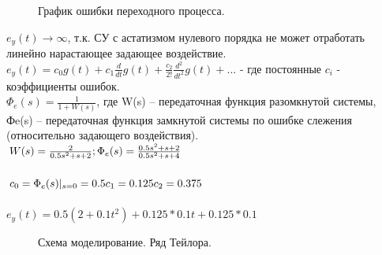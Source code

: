 \documentclass[a4paper, 11pt]{article}
\begin{document}
\begin{figure}[h!]
    \caption{График ошибки переходного процесса.}
    \label{tree}
\end{figure}

\newpage

$e_y(t)\to\infty$, т.к. СУ с астатизмом нулевого порядка не может отработать линейно нарастающее задающее воздействие.\\

$e_y(t)=c_0g(t)+c_1\frac{d}{dt}g(t)+\frac{c_2}{2!}\frac{d^2}{dt^2}g(t)+...$ - где постоянные $c_i$ - коэффициенты ошибок.\\

$\Phi_e(s)=\frac{1}{1+W(s)}$, где W(s) – передаточная функция разомкнутой системы, Фe(s) – передаточная функция замкнутой системы по ошибке слежения (относительно задающего воздействия).\\
$W(s)=\frac {2} {0.5s^2+s+2}; \\\\
\Phi_e(s)=\frac{0.5s^2+s+2}{0.5s^2+s+4}$ \\\\
$c_0=\Phi_e(s) | _{s=0} =0.5 \\  c_1=0.125 \\ c_2=0.375$ \\\\
$e_y(t)=0.5(2+0.1t^2)+0.125*0.1t+0.125*0.1$

\begin{figure}[h]
    \caption{Схема моделирование. Ряд Тейлора.}
    \label{tree}
\end{figure}
\end{document}
